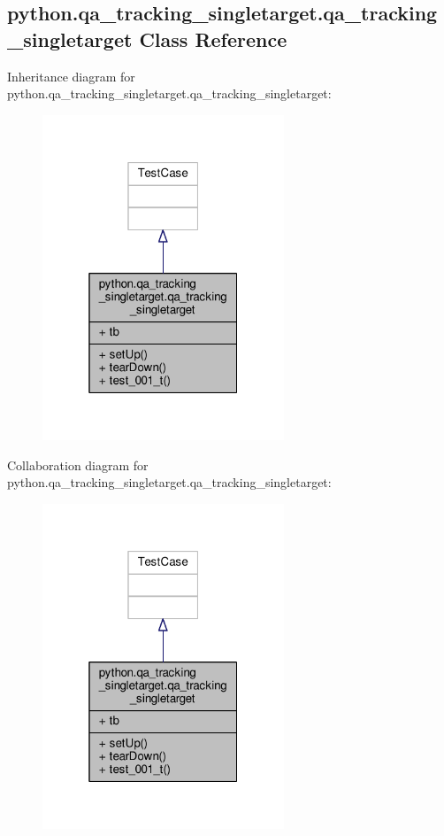 \subsection{python.\+qa\+\_\+tracking\+\_\+singletarget.\+qa\+\_\+tracking\+\_\+singletarget Class Reference}
\label{classpython_1_1qa__tracking__singletarget_1_1qa__tracking__singletarget}


Inheritance diagram for python.\+qa\+\_\+tracking\+\_\+singletarget.\+qa\+\_\+tracking\+\_\+singletarget\+:
\nopagebreak
\begin{figure}[H]
\begin{center}
\leavevmode
\includegraphics[width=205pt]{de/d81/classpython_1_1qa__tracking__singletarget_1_1qa__tracking__singletarget__inherit__graph}
\end{center}
\end{figure}


Collaboration diagram for python.\+qa\+\_\+tracking\+\_\+singletarget.\+qa\+\_\+tracking\+\_\+singletarget\+:
\nopagebreak
\begin{figure}[H]
\begin{center}
\leavevmode
\includegraphics[width=205pt]{d6/d54/classpython_1_1qa__tracking__singletarget_1_1qa__tracking__singletarget__coll__graph}
\end{center}
\end{figure}
